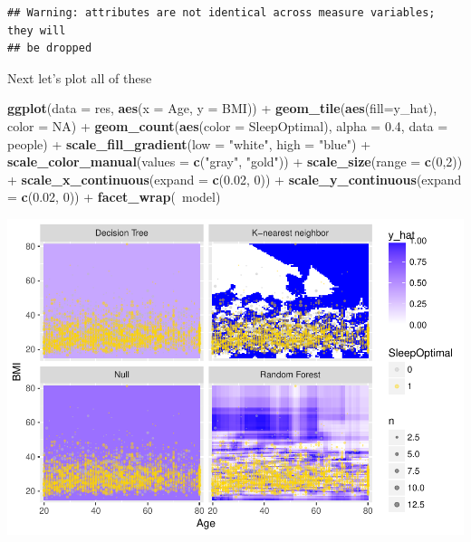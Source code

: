 \documentclass[]{article}
\newenvironment{Shaded}{\begin{snugshade}}{\end{snugshade}}
\newcommand{\KeywordTok}[1]{\textcolor[rgb]{0.13,0.29,0.53}{\textbf{{#1}}}}
\newcommand{\DataTypeTok}[1]{\textcolor[rgb]{0.13,0.29,0.53}{{#1}}}
\newcommand{\DecValTok}[1]{\textcolor[rgb]{0.00,0.00,0.81}{{#1}}}
\newcommand{\FloatTok}[1]{\textcolor[rgb]{0.00,0.00,0.81}{{#1}}}
\newcommand{\StringTok}[1]{\textcolor[rgb]{0.31,0.60,0.02}{{#1}}}
\newcommand{\OtherTok}[1]{\textcolor[rgb]{0.56,0.35,0.01}{{#1}}}
\newcommand{\NormalTok}[1]{{#1}}
\begin{document}
\begin{verbatim}
## Warning: attributes are not identical across measure variables; they will
## be dropped
\end{verbatim}

Next let's plot all of these

\begin{Shaded}
\begin{Highlighting}[]
\KeywordTok{ggplot}\NormalTok{(}\DataTypeTok{data =} \NormalTok{res, }\KeywordTok{aes}\NormalTok{(}\DataTypeTok{x =} \NormalTok{Age, }\DataTypeTok{y =} \NormalTok{BMI)) +}
\StringTok{  }\KeywordTok{geom_tile}\NormalTok{(}\KeywordTok{aes}\NormalTok{(}\DataTypeTok{fill=}\NormalTok{y_hat), }\DataTypeTok{color =} \OtherTok{NA}\NormalTok{) +}
\StringTok{  }\KeywordTok{geom_count}\NormalTok{(}\KeywordTok{aes}\NormalTok{(}\DataTypeTok{color =} \NormalTok{SleepOptimal), }\DataTypeTok{alpha =} \FloatTok{0.4}\NormalTok{, }\DataTypeTok{data =} \NormalTok{people) +}
\StringTok{  }\KeywordTok{scale_fill_gradient}\NormalTok{(}\DataTypeTok{low =} \StringTok{"white"}\NormalTok{, }\DataTypeTok{high =} \StringTok{"blue"}\NormalTok{) +}
\StringTok{  }\KeywordTok{scale_color_manual}\NormalTok{(}\DataTypeTok{values =} \KeywordTok{c}\NormalTok{(}\StringTok{"gray"}\NormalTok{, }\StringTok{"gold"}\NormalTok{)) +}
\StringTok{  }\KeywordTok{scale_size}\NormalTok{(}\DataTypeTok{range =} \KeywordTok{c}\NormalTok{(}\DecValTok{0}\NormalTok{,}\DecValTok{2}\NormalTok{)) +}
\StringTok{  }\KeywordTok{scale_x_continuous}\NormalTok{(}\DataTypeTok{expand =} \KeywordTok{c}\NormalTok{(}\FloatTok{0.02}\NormalTok{, }\DecValTok{0}\NormalTok{)) +}
\StringTok{  }\KeywordTok{scale_y_continuous}\NormalTok{(}\DataTypeTok{expand =} \KeywordTok{c}\NormalTok{(}\FloatTok{0.02}\NormalTok{, }\DecValTok{0}\NormalTok{)) +}
\StringTok{  }\KeywordTok{facet_wrap}\NormalTok{(~model)}
\end{Highlighting}
\end{Shaded}

\includegraphics{Hmwk7AnswerKey_files/figure-latex/unnamed-chunk-22-1.pdf}
\end{document}
